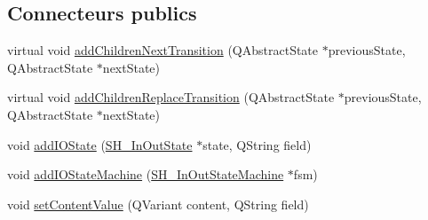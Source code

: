 \subsection*{Connecteurs publics}
\begin{DoxyCompactItemize}
\item 
virtual void \hyperlink{classSimpleHotel_1_1SH__InOutStateMachine_aaf5afe04d6e4d3d5ebf0b5f1b00eddf1}{add\-Children\-Next\-Transition} (Q\-Abstract\-State $\ast$previous\-State, Q\-Abstract\-State $\ast$next\-State)
\item 
virtual void \hyperlink{classSimpleHotel_1_1SH__InOutStateMachine_a3339fd43658e6ac0979bd43014785766}{add\-Children\-Replace\-Transition} (Q\-Abstract\-State $\ast$previous\-State, Q\-Abstract\-State $\ast$next\-State)
\item 
void \hyperlink{classSimpleHotel_1_1SH__InOutStateMachine_a07ae9f1f74a9a41b26e77a014679a33e}{add\-I\-O\-State} (\hyperlink{classSimpleHotel_1_1SH__InOutState}{S\-H\-\_\-\-In\-Out\-State} $\ast$state, Q\-String field)
\item 
void \hyperlink{classSimpleHotel_1_1SH__InOutStateMachine_a27a59a44e0bcddf90d40b38788bb38f4}{add\-I\-O\-State\-Machine} (\hyperlink{classSimpleHotel_1_1SH__InOutStateMachine}{S\-H\-\_\-\-In\-Out\-State\-Machine} $\ast$fsm)
\item 
void \hyperlink{classSimpleHotel_1_1SH__InOutStateMachine_aaf92da452f6cf7cc57aa9e60f88322e4}{set\-Content\-Value} (Q\-Variant content, Q\-String field)
\end{DoxyCompactItemize}
